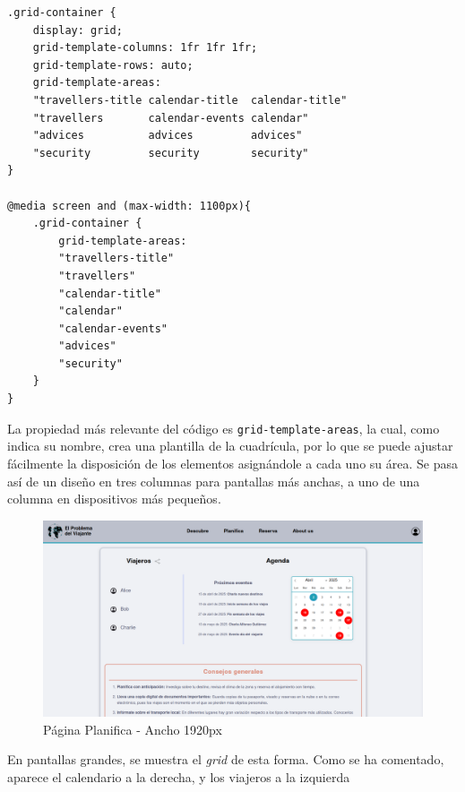 \documentclass[11pt, a4paper]{book}
\begin{document}
	\begin{lstlisting}[]
.grid-container {
	display: grid;
	grid-template-columns: 1fr 1fr 1fr;
	grid-template-rows: auto;
	grid-template-areas:
	"travellers-title calendar-title  calendar-title"
	"travellers       calendar-events calendar"
	"advices          advices         advices"
	"security         security        security"
}

@media screen and (max-width: 1100px){
	.grid-container {
		grid-template-areas:
		"travellers-title"
		"travellers"
		"calendar-title"
		"calendar"
		"calendar-events"
		"advices"
		"security"
	}
}
	\end{lstlisting}

	La propiedad más relevante del código es \texttt{grid-template-areas}, la cual, como indica su nombre, crea una plantilla de la cuadrícula, por lo que se puede ajustar fácilmente la disposición de los elementos asignándole a cada uno su área. Se pasa así de un diseño en tres columnas para pantallas más anchas, a uno de una columna en dispositivos más pequeños.
	
	\begin{figure} [H]
		\centering
		\includegraphics[width=\textwidth]{CSS/2-1 1920.png}
		\caption{Página Planifica - Ancho 1920px}
	\end{figure}

	En pantallas grandes, se muestra el \textit{grid} de esta forma. Como se ha comentado, aparece el calendario a la derecha, y los viajeros a la izquierda
\end{document}
